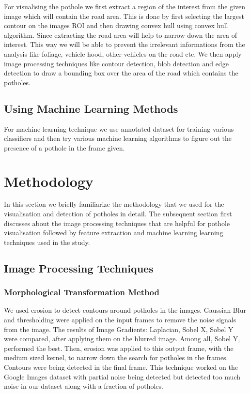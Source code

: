 \documentclass[journal]{IEEEtran}
\begin{document}
For visualising the pothole we first extract a region of the interest from the given image which will contain the road area. This is done by first selecting the largest contour on the images ROI and then drawing convex hull using convex hull algorithm. Since extracting the road area will help to narrow down the area of interest. This way we will be able to prevent the irrelevant informations from the analysis like foliage, vehicle hood, other vehicles on the road etc. We then apply image processing techniques like contour detection, blob detection and edge detection to draw a bounding box over the area of the road which contains the potholes.

\subsection{Using Machine Learning Methods}
For machine learning technique we use annotated dataset \cite{dataset} for training various classifiers and then try various machine learning algorithms to figure out the presence of a pothole in the frame given.

\section{Methodology}

In this section we briefly familiarize the methodology that we used for the visualisation and detection of potholes in detail. The subsequent section first discusses about the image processing techniques that are helpful for pothole visualisation followed by feature extraction and machine learning learning techniques  used in the study.

\subsection{Image Processing Techniques}

\subsubsection{Morphological Transformation Method}
We used erosion to detect contours around potholes in the images. Gaussian Blur and thresholding were applied on the input frames to remove the noise signals from the image. The results of Image Gradients: Laplacian, Sobel X, Sobel Y were compared, after applying them on the blurred image. Among all, Sobel Y, performed the best. Then, erosion was applied to this output frame, with the medium sized kernel, to narrow down the search for potholes in the frames. Contours were being detected in the final frame. This technique worked on the Google Images dataset with partial noise being detected but detected too much noise in our dataset along with a fraction of potholes.
\end{document}
